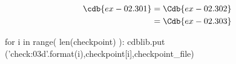 \documentclass[12pt]{cdblatex}
\begin{document}
\begin{align}
   \cdb{ex-02.301} &= \Cdb{ex-02.302}\\
                   &= \Cdb{ex-02.303}
\end{align}

\clearpage


\bgroup
{}
\begin{cadabra}
   for i in range( len(checkpoint) ):
      cdblib.put ('check{:03d}'.format(i),checkpoint[i],checkpoint_file)
\end{cadabra}
\egroup
\end{document}
